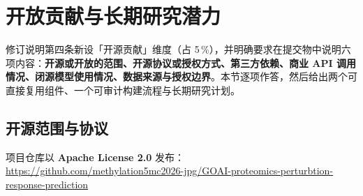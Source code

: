 \section{开放贡献与长期研究潜力}
\label{sec:oss}

修订说明第四条新设「开源贡献」维度（占 5\,\%），并明确要求在提交物中说明六项内容：\textbf{开源或开放的范围、开源协议或授权方式、第三方依赖、商业 API 调用情况、闭源模型使用情况、数据来源与授权边界}。本节逐项作答，然后给出两个可直接复用组件、一个可审计构建流程与长期研究计划。

\subsection{开源范围与协议}

项目仓库以 \textbf{Apache License 2.0} 发布：\\
{\small\url{https://github.com/methylation5mc2026-jpg/GOAI-proteomics-perturbtion-response-prediction}}

